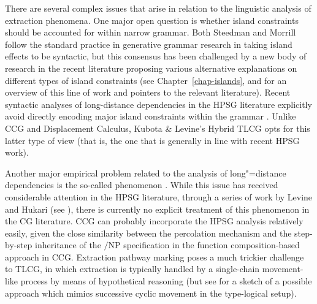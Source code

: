 \documentclass[output=paper]{langsci/langscibook}
\begin{document}
There are several complex issues that arise in relation to the
linguistic analysis of extraction phenomena. One major open question
is whether island constraints should be accounted for within narrow
grammar. Both Steedman and Morrill follow the standard practice in
generative grammar research in taking island effects to be syntactic,
but this consensus has been challenged by a new body of research in
the recent literature proposing various alternative explanations on
different types of island constraints (see Chapter~\ref{chap-islands}, \citet{levine2017}
and \citet{newmeyer2016} for an overview of this line of work and
pointers to the relevant literature). Recent
syntactic analyses of long-distance dependencies in the HPSG
literature explicitly avoid directly encoding major island constraints
within the grammar \citep{Sag2010b,chaves12b}. Unlike 
CCG and Displacement Calculus, Kubota \& Levine's Hybrid TLCG
opts for this latter type of view (that is, the one that is generally in
line with recent HPSG work). 

Another major empirical problem related to the analysis of
long"=distance dependencies is the so-called  phenomenon \citep{mccloskey79,Zaenen83a-u}. While this issue
has received considerable attention in the HPSG literature, through a
series of work by Levine and Hukari (see \citealt{LH2006a}), there is
currently no explicit treatment of this phenomenon in the CG
literature. CCG can probably incorporate the HPSG analysis relatively
easily, given the close similarity between the \slasch percolation
mechanism and the step-by-step inheritance of the $/$NP specification
in the function composition-based approach in CCG. Extraction pathway
marking poses a much trickier challenge to TLCG, in which extraction
is typically handled by a single-chain movement-like process by means
of hypothetical reasoning (but see \citet[Chapter 7]{KubotaLevineBook}
for a sketch of a possible approach which mimics successive cyclic
movement in the type-logical setup).


\end{document}
